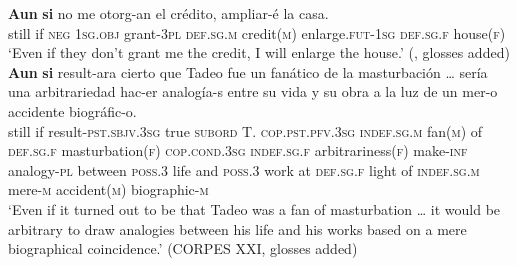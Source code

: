\begin{exe}
	\ex\label{exAppendixSpanishAunSi1}
	\gll \textbf{Aun} \textbf{si} no me otorg-an el crédito, ampliar-é la casa.\\
	still if \textsc{neg} 1\textsc{sg}.\textsc{obj} grant-3\textsc{pl} \textsc{def}.\textsc{sg}.\textsc{m} credit(\textsc{m}) enlarge.\textsc{fut}-1\textsc{sg} \textsc{def}.\textsc{sg}.\textsc{f} house(\textsc{f})\\
	\glt \lq Even if they don't grant me the credit, I will enlarge the house.' (\cite[§47.2o]{RAEGramatica}, glosses added)
	\ex\label{exAppendixSpanishAunSi2}
	 \gll  \textbf{Aun} \textbf{si} result-ara cierto que Tadeo fue un fanático de la masturbación … sería una arbitrariedad hac-er analogía-s entre su vida y su obra a la luz de un mer-o accidente biográfic-o.\\
	 still if result-\textsc{pst}.\textsc{sbjv}.3\textsc{sg} true \textsc{subord} T. \textsc{cop}.\textsc{pst}.\textsc{pfv}.3\textsc{sg} \textsc{indef}.\textsc{sg}.\textsc{m} fan(\textsc{m}) of \textsc{def}.\textsc{sg}.\textsc{f} masturbation(\textsc{f}) {} \textsc{cop}.\textsc{cond}.3\textsc{sg} \textsc{indef}.\textsc{sg}.\textsc{f} arbitrariness(\textsc{f}) make-\textsc{inf} analogy-\textsc{pl} between \textsc{poss}.3 life and \textsc{poss}.3 work at \textsc{def}.\textsc{sg}.\textsc{f} light of \textsc{indef}.\textsc{sg}.\textsc{m} mere-\textsc{m} accident(\textsc{m}) biographic-\textsc{m}\\	 
	 \glt \lq Even if it turned out to be that Tadeo was a fan of masturbation … it would be arbitrary to draw analogies between his life and his works based on a mere biographical coincidence.\rq{ }(CORPES XXI, glosses added)
\end{exe}

